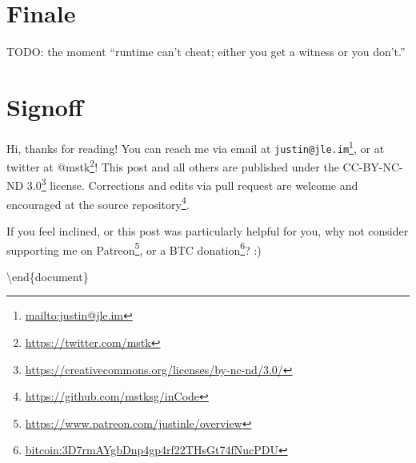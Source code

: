 \documentclass[]{article}
\renewcommand{\href}[2]{#2\footnote{\url{#1}}}
\begin{document}
\section{Finale}\label{finale}

TODO: the moment ``runtime can't cheat; either you get a witness or you don't.''

\section{Signoff}\label{signoff}

Hi, thanks for reading! You can reach me via email at
\href{mailto:justin@jle.im}{\nolinkurl{justin@jle.im}}, or at twitter at
\href{https://twitter.com/mstk}{@mstk}! This post and all others are published
under the \href{https://creativecommons.org/licenses/by-nc-nd/3.0/}{CC-BY-NC-ND
3.0} license. Corrections and edits via pull request are welcome and encouraged
at \href{https://github.com/mstksg/inCode}{the source repository}.

If you feel inclined, or this post was particularly helpful for you, why not
consider \href{https://www.patreon.com/justinle/overview}{supporting me on
Patreon}, or a \href{bitcoin:3D7rmAYgbDnp4gp4rf22THsGt74fNucPDU}{BTC donation}?
:)

\textbackslash end\{document\}
\end{document}
